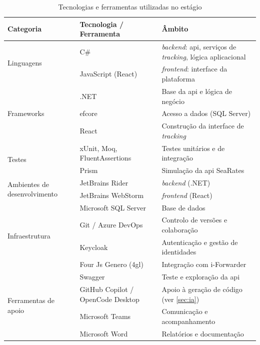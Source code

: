 \begin{table}[H]
\centering
\caption{Tecnologias e ferramentas utilizadas no estágio}
\label{tab:tecnologias}
\small
\begin{tabular}{@{}p{} p{} p{}@{}}
\toprule
\textbf{Categoria} & \textbf{Tecnologia / Ferramenta} & \textbf{Âmbito} \\
\midrule
\multirow{2}{=}{Linguagens}
  & C\# & \textit{backend}: \gls{api}, serviços de \textit{tracking}, lógica aplicacional \\
  & JavaScript (React) & \textit{frontend}: interface da plataforma \\
\midrule
\multirow{3}{=}{Frameworks}
  & .NET \cite{dotnet} & Base da \gls{api} e lógica de negócio \\
  & \gls{efcore} \cite{efcore} & Acesso a dados (SQL Server) \\
  & React \cite{react} & Construção da interface de \textit{tracking} \\
\midrule
\multirow{2}{=}{Testes}
  & xUnit, Moq, FluentAssertions \cite{xunit,moq,fluentassertions} & Testes unitários e de integração \\
  & Prism \cite{prism} & Simulação da \gls{api} SeaRates \\
\midrule
\multirow{2}{=}{Ambientes de desenvolvimento}
  & JetBrains Rider \cite{rider} & \textit{backend} (.NET) \\
  & JetBrains WebStorm \cite{webstorm} & \textit{frontend} (React) \\
\midrule
\multirow{4}{=}{Infraestrutura}
  & Microsoft SQL Server \cite{sqlserver} & Base de dados \\
  & Git / Azure DevOps \cite{azuredevops} & Controlo de versões e colaboração \\
  & Keycloak \cite{keycloak} & Autenticação e gestão de identidades \\
  & Four Js Genero (\gls{4gl}) \cite{fourjs} & Integração com i-Forwarder \\
\midrule
\multirow{4}{=}{Ferramentas de apoio}
  & Swagger \cite{swagger} & Teste e exploração da \gls{api} \\
  & GitHub Copilot \cite{copilot} / OpenCode Desktop~\cite{opencode} & Apoio à geração de código (ver \autoref{sec:ia}) \\
  & Microsoft Teams & Comunicação e acompanhamento \\
  & Microsoft Word & Relatórios e documentação \\
\bottomrule
\end{tabular}
\end{table}

